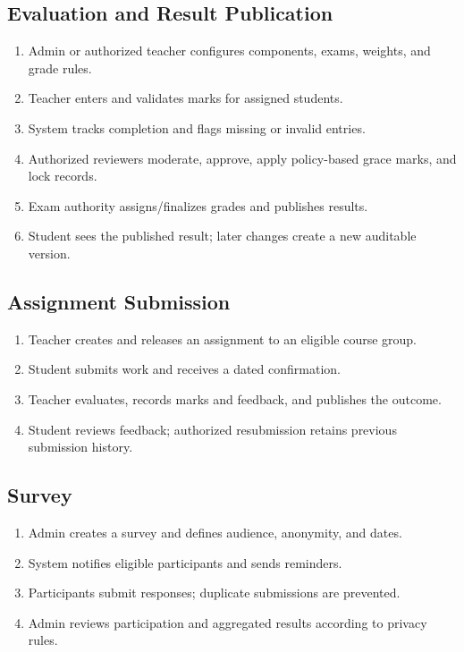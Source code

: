 \documentclass[10pt,a4paper]{article}
\begin{document}
\subsection{Evaluation and Result Publication}
\begin{enumerate}
  \item Admin or authorized teacher configures components, exams, weights, and grade rules.
  \item Teacher enters and validates marks for assigned students.
  \item System tracks completion and flags missing or invalid entries.
  \item Authorized reviewers moderate, approve, apply policy-based grace marks, and lock records.
  \item Exam authority assigns/finalizes grades and publishes results.
  \item Student sees the published result; later changes create a new auditable version.
\end{enumerate}

\subsection{Assignment Submission}
\begin{enumerate}
  \item Teacher creates and releases an assignment to an eligible course group.
  \item Student submits work and receives a dated confirmation.
  \item Teacher evaluates, records marks and feedback, and publishes the outcome.
  \item Student reviews feedback; authorized resubmission retains previous submission history.
\end{enumerate}

\subsection{Survey}
\begin{enumerate}
  \item Admin creates a survey and defines audience, anonymity, and dates.
  \item System notifies eligible participants and sends reminders.
  \item Participants submit responses; duplicate submissions are prevented.
  \item Admin reviews participation and aggregated results according to privacy rules.
\end{enumerate}
\end{document}
